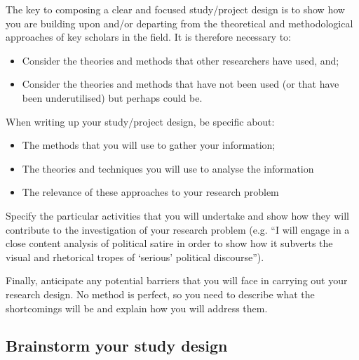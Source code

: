 \documentclass[12pt, a4paper]{article}
\begin{document}
The key to composing a clear and focused study/project design is to show how you are building upon and/or departing from the theoretical and methodological approaches of key scholars in the field. It is therefore necessary to:
\begin{itemize}
\item Consider the theories and methods that other researchers have used, and;
\item Consider the theories and methods that have not been used (or that have been underutilised) but perhaps could be.
\end{itemize}

When writing up your study/project design, be specific about:
\begin{itemize}
\item The methods that you will use to gather your information;
\item The theories and techniques you will use to analyse the information
\item The relevance of these approaches to your research problem
\end{itemize}

Specify the particular activities that you will undertake and show how they will contribute to the investigation of your research problem (e.g. “I will engage in a close content analysis of political satire in order to show how it subverts the visual and rhetorical tropes of ‘serious’ political discourse”).

Finally, anticipate any potential barriers that you will face in carrying out your research design. No method is perfect, so you need to describe what the shortcomings will be and explain how you will address them.

\subsection{Brainstorm your study design}
\end{document}
